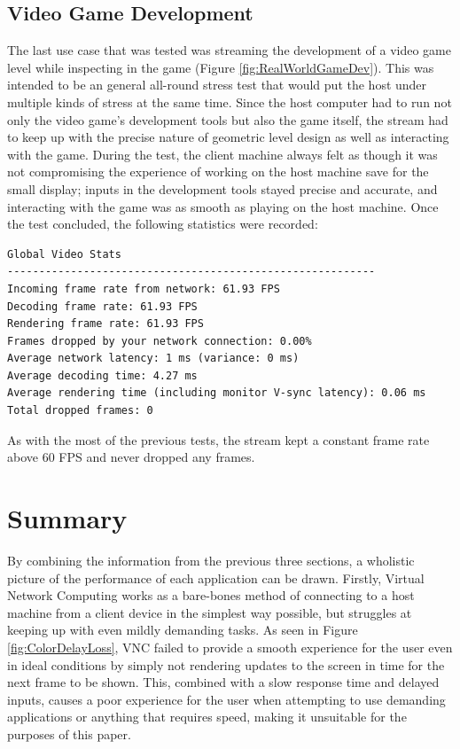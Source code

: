 \subsection{Video Game Development}\label{subsec:RealWorldVideoGame}

The last use case that was tested was streaming the development of a video game level while inspecting in the game (Figure \ref{fig:RealWorldGameDev}).
This was intended to be an general all-round stress test that would put the host under multiple kinds of stress at the same time.
Since the host computer had to run not only the video game's development tools but also the game itself, the stream had to keep up with the precise nature of geometric level design as well as interacting with the game.
During the test, the client machine always felt as though it was not compromising the experience of working on the host machine save for the small display; inputs in the development tools stayed precise and accurate, and interacting with the game was as smooth as playing on the host machine.
Once the test concluded, the following statistics were recorded:

\begin{lstlisting}[style=plaintext,title=Statistics recorded while streaming the development of a video game level (Figure \ref{fig:RealWorldGameDev})]
Global Video Stats
----------------------------------------------------------
Incoming frame rate from network: 61.93 FPS
Decoding frame rate: 61.93 FPS
Rendering frame rate: 61.93 FPS
Frames dropped by your network connection: 0.00%
Average network latency: 1 ms (variance: 0 ms)
Average decoding time: 4.27 ms
Average rendering time (including monitor V-sync latency): 0.06 ms
Total dropped frames: 0
\end{lstlisting}

As with the most of the previous tests, the stream kept a constant frame rate above 60 FPS and never dropped any frames.


\section{Summary}\label{sec:EvaluationSummary}

By combining the information from the previous three sections, a wholistic picture of the performance of each application can be drawn. Firstly, Virtual Network Computing works as a bare-bones method of connecting to a host machine from a client device in the simplest way possible, but struggles at keeping up with even mildly demanding tasks.
As seen in Figure \ref{fig:ColorDelayLoss}, VNC failed to provide a smooth experience for the user even in ideal conditions by simply not rendering updates to the screen in time for the next frame to be shown.
This, combined with a slow response time and delayed inputs, causes a poor experience for the user when attempting to use demanding applications or anything that requires speed, making it unsuitable for the purposes of this paper.

